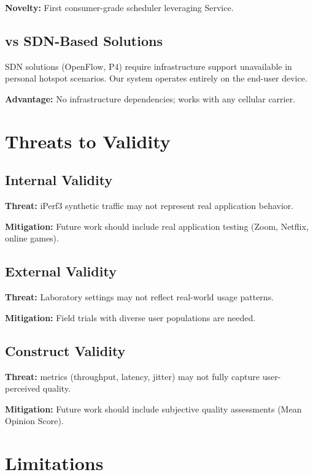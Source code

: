 \textbf{Novelty:} First consumer-grade \qos scheduler leveraging \vpn Service.

\subsection{vs SDN-Based Solutions}

SDN solutions (OpenFlow, P4) require infrastructure support unavailable in personal hotspot scenarios. Our system operates entirely on the end-user device.

\textbf{Advantage:} No infrastructure dependencies; works with any cellular carrier.

\section{Threats to Validity}

\subsection{Internal Validity}

\textbf{Threat:} iPerf3 synthetic traffic may not represent real application behavior.

\textbf{Mitigation:} Future work should include real application testing (Zoom, Netflix, online games).

\subsection{External Validity}

\textbf{Threat:} Laboratory settings may not reflect real-world usage patterns.

\textbf{Mitigation:} Field trials with diverse user populations are needed.

\subsection{Construct Validity}

\textbf{Threat:} \qos metrics (throughput, latency, jitter) may not fully capture user-perceived quality.

\textbf{Mitigation:} Future work should include subjective quality assessments (Mean Opinion Score).

\section{Limitations}


